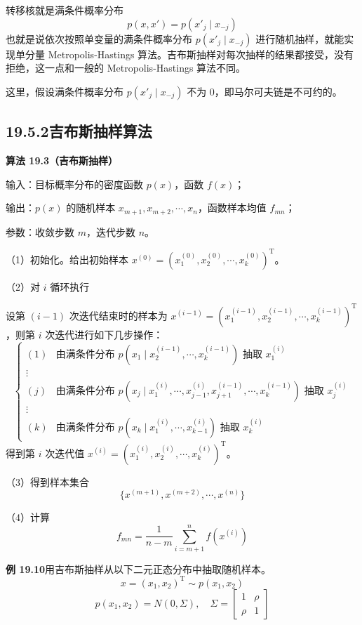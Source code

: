 \documentclass[UTF8,12pt,a4paper,fontset=fandol]{ctexart}
\begin{document}
转移核就是满条件概率分布
\begin{equation}
p(x,x')=p(x'_j\mid x_{-j})
\tag{19.51}
\end{equation}
也就是说依次按照单变量的满条件概率分布 $p(x'_j\mid x_{-j})$ 进行随机抽样，就能实现单分量 Metropolis-Hastings 算法。吉布斯抽样对每次抽样的结果都接受，没有拒绝，这一点和一般的 Metropolis-Hastings 算法不同。

这里，假设满条件概率分布 $p(x'_j\mid x_{-j})$ 不为 0，即马尔可夫链是不可约的。

\subsection*{19.5.2\quad 吉布斯抽样算法}

\noindent\textbf{算法 19.3（吉布斯抽样）}

输入：目标概率分布的密度函数 $p(x)$，函数 $f(x)$；

输出：$p(x)$ 的随机样本 $x_{m+1},x_{m+2},\cdots,x_n$，函数样本均值 $f_{mn}$；

参数：收敛步数 $m$，迭代步数 $n$。

（1）初始化。给出初始样本 $x^{(0)}=(x_1^{(0)},x_2^{(0)},\cdots,x_k^{(0)})^{\mathrm{T}}$。

（2）对 $i$ 循环执行

设第 $(i-1)$ 次迭代结束时的样本为 $x^{(i-1)}=(x_1^{(i-1)},x_2^{(i-1)},\cdots,x_k^{(i-1)})^{\mathrm{T}}$，则第 $i$ 次迭代进行如下几步操作：
\[
\left\{
\begin{array}{ll}
(1) & \text{由满条件分布 }p(x_1\mid x_2^{(i-1)},\cdots,x_k^{(i-1)})\text{ 抽取 }x_1^{(i)}\\
\vdots & \\
(j) & \text{由满条件分布 }p(x_j\mid x_1^{(i)},\cdots,x_{j-1}^{(i)},x_{j+1}^{(i-1)},\cdots,x_k^{(i-1)})\text{ 抽取 }x_j^{(i)}\\
\vdots & \\
(k) & \text{由满条件分布 }p(x_k\mid x_1^{(i)},\cdots,x_{k-1}^{(i)})\text{ 抽取 }x_k^{(i)}
\end{array}
\right.
\]
得到第 $i$ 次迭代值 $x^{(i)}=(x_1^{(i)},x_2^{(i)},\cdots,x_k^{(i)})^{\mathrm{T}}$。

（3）得到样本集合
\[
\{x^{(m+1)},x^{(m+2)},\cdots,x^{(n)}\}
\]

（4）计算
\[
f_{mn}=\frac{1}{n-m}\sum_{i=m+1}^{n}f(x^{(i)})
\]

\noindent\textbf{例 19.10}\quad 用吉布斯抽样从以下二元正态分布中抽取随机样本。
\[
x=(x_1,x_2)^{\mathrm{T}}\sim p(x_1,x_2)
\]
\[
p(x_1,x_2)=N(0,\Sigma),\quad
\Sigma=
\begin{bmatrix}
1 & \rho\\
\rho & 1
\end{bmatrix}
\]
\end{document}
